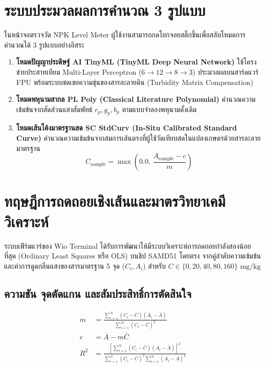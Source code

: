 \section{ระบบประมวลผลการคำนวณ 3 รูปแบบ}
ในหน้าจอตรวจวัด NPK Level Meter ผู้ใช้งานสามารถกดโยกจอยสติ๊กขึ้นเพื่อสลับโหมดการคำนวณได้ 3 รูปแบบอย่างอิสระ
\begin{enumerate}[leftmargin=1.5em, itemsep=3pt]
    \item \textbf{โหมดปัญญาประดิษฐ์ AI TinyML (TinyML Deep Neural Network)} ใช้โครงข่ายประสาทเทียม Multi-Layer Perceptron ($6 \to 12 \to 8 \to 3$) ประมวลผลบนฮาร์ดแวร์ FPU พร้อมระบบชดเชยความขุ่นของสารละลายดิน (Turbidity Matrix Compensation)
    \item \textbf{โหมดพหุนามสากล PL Poly (Classical Literature Polynomial)} คำนวณความเข้มข้นจากสัดส่วนแสงสัมพัทธ์ $r_p, g_p, b_p$ ตามแบบจำลองพหุนามดั้งเดิม
    \item \textbf{โหมดเส้นโค้งมาตรฐานสด SC StdCurv (In-Situ Calibrated Standard Curve)} คำนวณความเข้มข้นจากสมการเส้นตรงที่ผู้ใช้วัดเทียบสดในแปลงเกษตรด้วยสารละลายมาตรฐาน
    \begin{equation}
        C_{\text{sample}} = \max\left(0.0, \, \frac{A_{\text{sample}} - c}{m}\right)
    \end{equation}
\end{enumerate}

\section{ทฤษฎีการถดถอยเชิงเส้นและมาตรวิทยาเคมีวิเคราะห์}
ระบบเฟิร์มแวร์ของ Wio Terminal ได้รับการพัฒนาให้มีระบบวิเคราะห์การถดถอยกำลังสองน้อยที่สุด (Ordinary Least Squares หรือ OLS) บนชิป SAMD51 โดยตรง จากคู่ลำดับความเข้มข้นและค่าการดูดกลืนแสงของสารมาตรฐาน 5 จุด ($C_i, A_i$) สำหรับ $C \in \{0, 20, 40, 80, 160\}\text{ mg/kg}$

\subsection{ความชัน จุดตัดแกน และสัมประสิทธิ์การตัดสินใจ}
\begin{align}
    m &= \frac{\sum_{i=1}^N (C_i - \bar{C})(A_i - \bar{A})}{\sum_{i=1}^N (C_i - \bar{C})^2} \\
    c &= \bar{A} - m \bar{C} \\
    R^2 &= \frac{\left[\sum_{i=1}^N (C_i - \bar{C})(A_i - \bar{A})\right]^2}{\sum_{i=1}^N (C_i - \bar{C})^2 \sum_{i=1}^N (A_i - \bar{A})^2}
\end{align}

